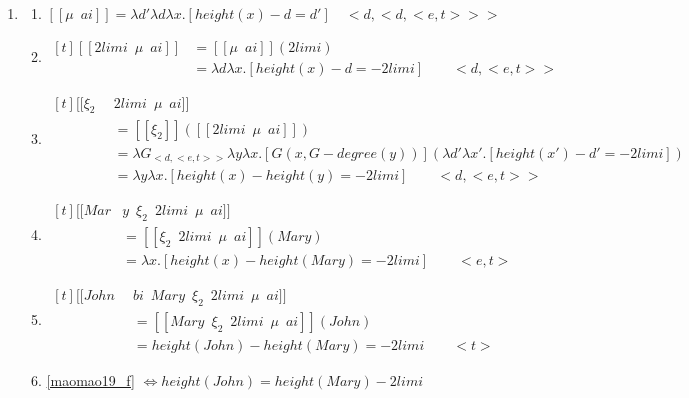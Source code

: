 \documentclass{ctexart}
\begin{document}
\begin{enumerate}
    \item \label{maomao19}
    \begin{enumerate}
        \item \label{maomao19_b}
        $[\![\mu \enspace ai]\!]=\lambda d' \lambda d \lambda x.[height(x)-d=d'] \quad <d,<d,<e,t>>>$

        \item \label{maomao19_c}
        $\begin{aligned}[t]
            [\![2limi \enspace \mu \enspace ai]\!] &= [\![\mu \enspace ai]\!](2limi) \\
            &= \lambda d \lambda x. [height(x) - d = -2 limi] \qquad <d,<e,t>>
        \end{aligned}$

        \item \label{maomao19_d}
        $\begin{aligned}[t]
            [\![\xi_2 \enspace & 2limi \enspace \mu \enspace ai]\!] \\
            &= [\![\xi_2]\!]([\![2limi \enspace \mu \enspace ai]\!]) \\
            &= \lambda G_{<d,<e,t>>} \lambda y \lambda x. [G(x,G-degree(y))](\lambda d' \lambda x'. [height(x') - d' = -2 limi])\\
            &= \lambda y \lambda x. [height(x) - height(y) = -2 limi] \qquad <d,<e,t>>
        \end{aligned}$

        \item \label{maomao19_e}
        $\begin{aligned}[t]
            [\![Mar&y \enspace \xi_2 \enspace 2limi \enspace \mu \enspace ai]\!] \\
            &= [\![\xi_2 \enspace 2limi \enspace \mu \enspace ai]\!](Mary) \\
            &=\lambda x.[height(x) - height(Mary)=-2limi] \qquad <e,t>
        \end{aligned}$

        \item \label{maomao19_f}
        $\begin{aligned}[t]
            [\![John \enspace &bi \enspace Mary \enspace \xi_2 \enspace 2limi \enspace \mu \enspace ai]\!] \\
            &= [\![Mary \enspace \xi_2 \enspace 2limi \enspace \mu \enspace ai]\!](John) \\
            &=height(John) - height(Mary) = -2limi \qquad <t>
        \end{aligned}$

        \item \label{maomao19_g}
        \ref{maomao19_f} $\Leftrightarrow height(John) = height(Mary) - 2limi$

    \end{enumerate}
\end{enumerate}
\end{document}
